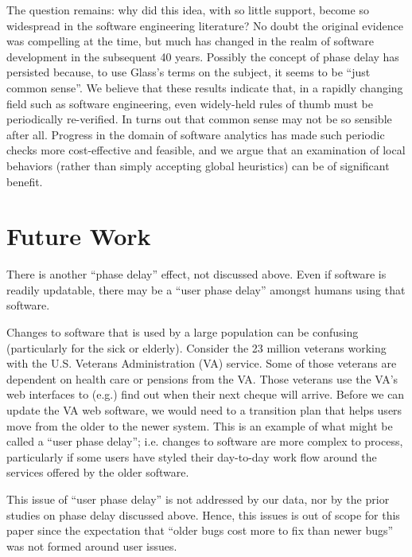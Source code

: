\documentclass{sig-alternate}
\begin{document}


The question remains: why did this idea, with so little support, become so widespread in the software engineering literature? No doubt the original evidence was compelling at the time, but much has changed in the realm of software development in the subsequent 40 years. Possibly the concept of phase delay has persisted because, to use Glass's terms on the subject, it seems to be ``just common sense''\cite{glass02}. 
We believe that these results indicate that, in a rapidly changing field such as software engineering, even widely-held rules of thumb must be periodically re-verified. In turns out that common sense may not be so sensible after all.
Progress in the domain of software analytics has made such periodic checks more cost-effective and feasible, and we argue that an examination of local behaviors (rather than simply accepting global heuristics) can be of significant benefit.

\section{Future Work}
There is another ``phase delay'' effect, not discussed above. Even if software is readily updatable, there   may be a ``user phase delay''   amongst   humans using that software. 

Changes to  software that is used by a large population can be confusing (particularly for the sick or elderly). 
Consider the 23 million veterans working with  the U.S.  Veterans 
Administration (VA) service. Some of those veterans are dependent on health care or pensions from the VA. Those veterans use the VA's web interfaces
to  (e.g.) find out
when their next cheque will arrive. Before we can update the VA web software, we would
need to  a transition plan that helps users   move from the older to the newer system. This is an example of what might be called a ``user phase delay''; i.e. changes to software are more complex to process, particularly if some users have styled
their day-to-day work flow around the services offered by the older software.  

This issue of ``user phase delay'' is not addressed by our data, nor by the prior studies on phase delay discussed above.  Hence, this issues   is out of scope for this paper since the expectation that ``older bugs cost more to fix than newer bugs'' was not formed around 
user issues. 
\end{document}
